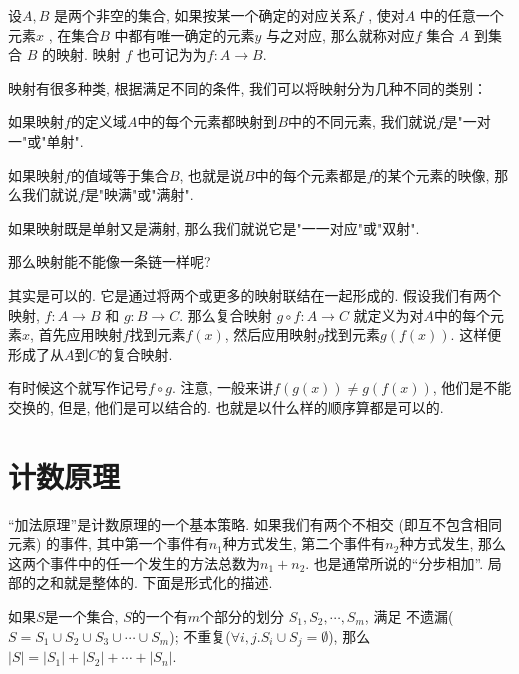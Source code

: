 \begin{definition}[映射]
  设$A,B$ 是两个非空的集合, 如果按某一个确定的对应关系$f$ , 
  使对$A$ 中的任意一个元素$x$ , 在集合$B$ 中都有唯一确定的元素$y$ 与之对应, 
  那么就称对应$f$ 集合 $A$ 到集合 $B$ 的映射. 映射 $f$ 也可记为为$f:A\to B$.
\end{definition}



映射有很多种类, 根据满足不同的条件, 我们可以将映射分为几种不同的类别：

\begin{definition}
  如果映射$f$的定义域$A$中的每个元素都映射到$B$中的不同元素, 我们就说$f$是"一对一"或"单射". 
\end{definition}

\begin{definition}
  如果映射$f$的值域等于集合$B$, 也就是说$B$中的每个元素都是$f$的某个元素的映像, 那么我们就说$f$是"映满"或"满射". 
\end{definition}

\begin{definition}
  如果映射既是单射又是满射, 那么我们就说它是"一一对应"或"双射". 
\end{definition}

 那么映射能不能像一条链一样呢? 

其实是可以的. 它是通过将两个或更多的映射联结在一起形成的. 
假设我们有两个映射, $f: A \to B$ 和 $g: B \to C$. 
那么复合映射 $g\circ f: A \to C$ 就定义为对$A$中的每个元素$x$, 
首先应用映射$f$找到元素$f(x)$, 然后应用映射$g$找到元素$g(f(x))$. 
这样便形成了从$A$到$C$的复合映射. 

有时候这个就写作记号$f\circ g$. 注意, 一般来讲$f(g(x))\neq g(f(x))$, 他们是不能交换的, 
但是, 他们是可以结合的. 也就是以什么样的顺序算都是可以的. 

\section{计数原理}

 ``加法原理''是计数原理的一个基本策略. 
如果我们有两个不相交 (即互不包含相同元素) 的事件, 其中第一个事件有$n_1$种方式发生, 
第二个事件有$n_2$种方式发生, 那么这两个事件中的任一个发生的方法总数为$n_1 + n_2$. 
也是通常所说的``分步相加''. 局部的之和就是整体的. 下面是形式化的描述. 

\begin{principle}[加法原理]
如果$S$是一个集合, $S$的一个有$m$个部分的划分
$S_1, S_2,\cdots, S_m$, 满足
不遗漏($S=S_1 \cup S_2 \cup S_3 \cup \cdots \cup S_m$); 不重复($\forall 
i,j. S_i \cup S_j = \emptyset$), 那么$|S|=|S_1|+|S_2|+\cdots+|S_n|$. 
\end{principle}

